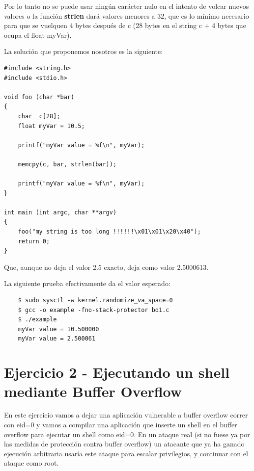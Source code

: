 \documentclass[]{article}
\begin{document}
Por lo tanto no se puede usar ningún carácter nulo en el intento de volcar nuevos valores o la función \textbf{strlen} dará valores menores a 32, que es lo mínimo necesario para que se vuelquen 4 bytes después de c (28 bytes en el string c + 4 bytes que ocupa el float myVar).

\newpage

La solución que proponemos nosotros es la siguiente:


\begin{lstlisting}
#include <string.h>
#include <stdio.h>

void foo (char *bar)
{
	char  c[28];		   
	float myVar = 10.5;  
	
	printf("myVar value = %f\n", myVar);
	
	memcpy(c, bar, strlen(bar)); 
	
	printf("myVar value = %f\n", myVar);
}

int main (int argc, char **argv)
{
	foo("my string is too long !!!!!!\x01\x01\x20\x40");
	return 0;
}
\end{lstlisting}

Que, aunque no deja el valor 2.5 exacto, deja como valor 2.5000613. 

La siguiente prueba efectivamente da el valor esperado:

\begin{verbatim}
	$ sudo sysctl -w kernel.randomize_va_space=0
	$ gcc -o example -fno-stack-protector bo1.c
	$ ./example
	myVar value = 10.500000
	myVar value = 2.500061
\end{verbatim}

\section{Ejercicio 2 - Ejecutando un shell mediante Buffer Overflow}

En este ejercicio vamos a dejar una aplicación vulnerable a buffer overflow correr con eid=0 y vamos a compilar una aplicación que inserte un shell
en el buffer overflow para ejecutar un shell como eid=0. En un ataque real (si no fuese ya por las medidas de protección contra buffer overflow) un atacante
que ya ha ganado ejecución arbitraria usaría este ataque para escalar privilegios, y continuar con el ataque como root.
\end{document}
